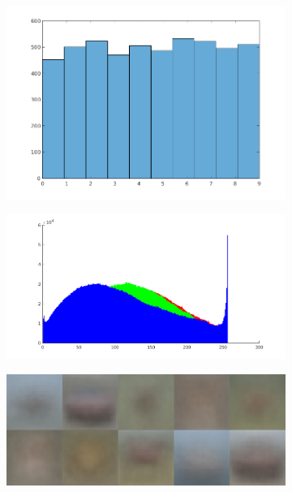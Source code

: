 \documentclass{article} %
\begin{document}
    \begin{figure}
        \centering
        \begin{subfigure}{.24\linewidth}
            \centering
            \includegraphics[width=\linewidth]{images/label-distribution.png}
        \caption{}
        \end{subfigure}
        \begin{subfigure}{.24\linewidth}
            \centering
            \includegraphics[width=\linewidth]{images/hist-overall.png}
        \caption{}
        \end{subfigure}
        \begin{subfigure}{.24\linewidth}
            \centering
            \includegraphics[width=\linewidth]{images/avg-img.png}

\end{subfigure}
\end{figure}
\end{document}
